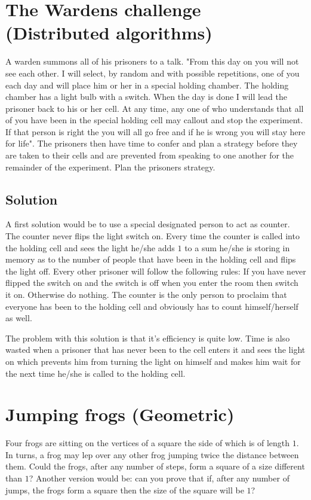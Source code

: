 \documentclass{article}
\begin{document}
\section{The Wardens challenge (Distributed algorithms)}
A warden summons all of his prisoners to a talk. "From this day on you will not see each other. I will select, by random and with possible repetitions, one of you each day and will place him or her in a special holding chamber. The holding chamber has a light bulb with a switch. When the day is done I will lead the prisoner back to his or her cell. At any time, any one of who understands that all of you have been in the special holding cell may callout and stop the experiment. If that person is right the you will all go free and if he is wrong you will stay here for life". The prisoners then have time to confer and plan a strategy before they are taken to their cells and are prevented from speaking to one another for the remainder of the experiment. Plan the prisoners strategy.

\subsection{Solution}
A first solution would be to use a special designated person to act as counter. The counter never flips the light switch on. Every time the counter is called into the holding cell and sees the light he/she adds $1$ to a sum he/she is storing in memory as to the number of people that have been in the holding cell and flips the light off. Every other prisoner will follow the following rules: If you have never flipped the switch on and the switch is off when you enter the room then switch it on. Otherwise do nothing. The counter is the only person to proclaim that everyone has been to the holding cell and obviously has to count himself/herself as well.

The problem with this solution is that it's efficiency is quite low. Time is also wasted when a prisoner that has never been to the cell enters it and sees the light on which prevents him from turning the light on himself and makes him wait for the next time he/she is called to the holding cell.

\section{Jumping frogs (Geometric)}
Four frogs are sitting on the vertices of a square the side of which is of length $1$. In turns, a frog may lep over any other frog jumping twice the distance between them. Could the frogs, after any number of steps, form a square of a size different than $1$? Another version would be: can you prove that if, after any number of jumps, the frogs form a square then the size of the square will be $1$?
\end{document}
